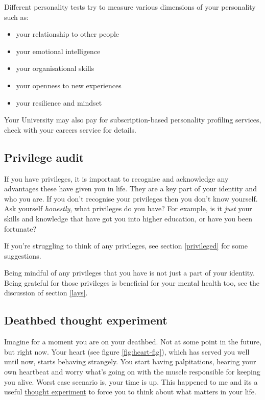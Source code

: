 \documentclass[
]{book}
\providecommand{\tightlist}{%
  \setlength{\itemsep}{0pt}\setlength{\parskip}{0pt}}
\begin{document}
Different personality tests try to measure various dimensions of your personality such as:

\begin{itemize}
\tightlist
\item
  your relationship to other people
\item
  your emotional intelligence
\item
  your organisational skills
\item
  your openness to new experiences
\item
  your resilience and mindset
\end{itemize}

Your University may also pay for subscription-based personality profiling services, check with your careers service for details.

\hypertarget{apriv}{%
\subsection{Privilege audit}\label{apriv}}

If you have privileges, it is important to recognise and acknowledge any advantages these have given you in life. They are a key part of your identity and who you are. If you don't recognise your privileges then you don't know yourself. Ask yourself \emph{honestly}, what privileges do you have? For example, is it \emph{just} your skills and knowledge that have got you into higher education, or have you been fortunate?

If you're struggling to think of any privileges, see section \ref{privileged} for some suggestions.

Being mindful of any privileges that you have is not just a part of your identity. Being grateful for those privileges is beneficial for your mental health too, see the discussion of section \ref{lays}.

\hypertarget{regrets}{%
\subsection{Deathbed thought experiment}\label{regrets}}

Imagine for a moment you are on your deathbed. Not at some point in the future, but right now. Your heart (see figure \ref{fig:heart-fig}), which has served you well until now, starts behaving strangely. You start having palpitations, hearing your own heartbeat \citep{elektrokardiogramm} and worry what's going on with the muscle responsible for keeping you alive. Worst case scenario is, your time is up. This happened to me and its a useful \href{https://en.wikipedia.org/wiki/Thought_experiment}{thought experiment} to force you to think about what matters in your life. \citep{deathbed}
\end{document}
